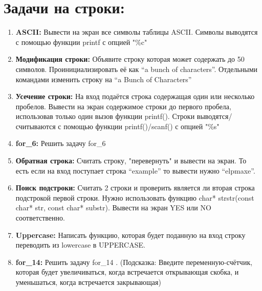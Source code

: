 \documentclass{article}
\begin{document}
\section*{Задачи на строки:}
\begin{enumerate}
\item \textbf{ASCII:} Вывести на экран все символы таблицы ASCII. Символы выводятся с помощью функции printf с опцией "\%c"
\item \textbf{Модификация строки:} Объявите строку которая может содержать до 50 символов. Проинициализировать её как ``a bunch of characters''. Отдельными командами изменить строку на ``a Bunch of Characters''
\item \textbf{Усечение строки:} На вход подаётся строка содержащая один или несколько пробелов. Вывести на экран содержимое строки до первого пробела, использовав только один вызов функции printf(). Строки выводятся/считываются с помощью функции printf()/scanf() с опцией "\%s"
\item \textbf{for\_6:} Решить задачу for\_6
\item \textbf{Обратная строка:} Считать строку, "перевернуть" и вывести на экран. То есть если на вход поступает строка ``example''  то вывести нужно ``elpmaxe''.
\item \textbf{Поиск подстроки:} Считать 2 строки и проверить является ли вторая строка подстрокой первой строки. Нужно использовать функцию char* strstr(const char* str, const char* substr). Вывести на экран YES или NO соответственно.
\item \textbf{Uppercase:} Написать функцию, которая будет поданную на вход строку переводить из lowercase в UPPERCASE.
\item \textbf{for\_14:} Решить задачу for\_14 . (Подсказка: Введите переменную-счётчик, которая будет увеличиваться, когда встречается открывающая скобка, и уменьшаться, когда встречается закрывающая)
\end{enumerate}
\end{document}
